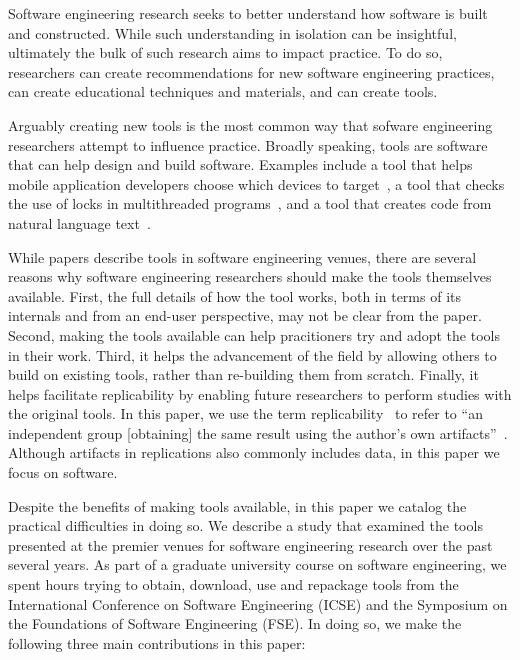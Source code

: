 \documentclass[10pt,conference]{IEEEtran}
\begin{document}
Software engineering research seeks to better
understand how software is built and constructed.
While such understanding in isolation can be insightful,
ultimately the bulk of such research 
aims to impact practice.
To do so, researchers can create recommendations
for new software engineering practices, can 
create educational techniques and materials, 
and can create tools.

Arguably creating new tools is the most common
way that sofware engineering researchers
attempt to influence practice.
Broadly speaking, tools are software that can
help design and build software.
Examples include a tool that helps mobile application
developers choose which devices to target~\cite{prada},
a tool that checks the use of locks in multithreaded programs~\cite{ernst},
and a tool that creates code from natural language text~\cite{desai}.

While papers describe tools in software engineering venues,
there are several reasons why software engineering researchers 
should make the tools themselves available.
First, the full details of how the tool works, both in terms of its internals
and from an end-user perspective, may not be clear from the paper.
Second, making the tools available can help pracitioners try and adopt
the tools in their work.
Third, it helps the advancement of the field by allowing others to build on 
existing tools, rather than re-building them from scratch.
Finally, it helps facilitate replicability by enabling future researchers
to perform studies with the original tools.
In this paper, we use the term replicability~\cite{vim2004international}
to refer to ``an independent group [obtaining] the same result using 
the author's own artifacts''~\cite{acmArtifactPolicy}.
Although artifacts in replications also commonly includes data,
in this paper we focus on software.

Despite the benefits of making tools available, in this paper
we catalog the practical difficulties in doing so.
We describe a study that examined the tools presented at the 
premier venues for software engineering research over the 
past several years.
As part of a graduate university course on software engineering, 
we spent \durationTotal hours trying to obtain, download, use
and repackage tools from the International Conference
on Software Engineering (ICSE) and the Symposium on the Foundations
of Software Engineering (FSE).
In doing so, we make the following three main 
contributions in this paper:
\end{document}
